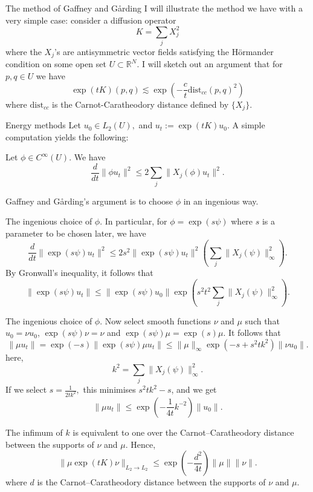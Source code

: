 \documentclass{beamer}
\numberwithin{equation}{section}
\theoremstyle{plain}
\theoremstyle{plain}
\theoremstyle{definition}
\theoremstyle{plain}
\theoremstyle{plain}
\theoremstyle{definition}
\newcommand{\Rl}{\mathbb{R}}
\begin{document}
\begin{frame}{The method of Gaffney and G\aa rding}
  I will illustrate the method we have with a very simple case: consider a diffusion operator
  \[
      K = \sum_{j} X_j^2
  \]
  where the $X_j$'s are antisymmetric vector fields satisfying the H\"ormander condition on some open set $U\subset \Rl^N.$
  \pause
  I will sketch out an argument that for $p,q\in U$ we have
  \[
        \exp(tK)(p,q) \lesssim \exp(-\frac{c}{t}\mathrm{dist}_{cc}(p,q)^2)
  \]
  where $\mathrm{dist}_{cc}$ is the Carnot-Caratheodory distance defined by $\{X_j\}.$
\end{frame}

\begin{frame}{Energy methods}
Let $u_0 \in L_2(U),$ and $u_t := \exp(tK)u_0.$ A simple computation yields the following:
\begin{lemma}
    Let $\phi \in C^\infty(U).$ We have
    \[
        \frac{d}{dt}\|\phi u_t\|^2 \leq 2\sum_j \|X_j(\phi)u_t\|^2.
    \]
\end{lemma}
Gaffney and G\aa rding's argument is to choose $\phi$ in an ingenious way.
\end{frame}

\begin{frame}{The ingenious choice of $\phi.$}
In particular, for $\phi = \exp(s\psi)$ where $s$ is a parameter to be chosen later, we have
\[
    \frac{d}{dt}\|\exp(s\psi)u_t\|^2 \leq 2s^2\|\exp(s\psi)u_t\|^2\left(\sum_{j}\|X_j(\psi)\|_{\infty}^2\right).
\]
By Gronwall's inequality, it follows that
\[
    \|\exp(s\psi)u_t\| \leq \|\exp(s\psi)u_0\|\exp(s^2t^2\sum_j \|X_j(\psi)\|_\infty^2).
\]
\end{frame}

\begin{frame}{The ingenious choice of $\phi.$}
Now select smooth functions $\nu$ and $\mu$ such that $u_0 = \nu u_0$, $\exp(s\psi)\nu = \nu$ and $\exp(s\psi)\mu = \exp(s)\mu.$
It follows that
\[
    \|\mu u_t\| = \exp(-s)\|\exp(s\psi)\mu u_t\| \leq \|\mu\|_\infty\exp(-s+s^2tk^2)\|\nu u_0\|.
\]
here,
\[
    k^2 = \sum_j \|X_j(\psi)\|_\infty^2.
\]
If we select $s = \frac{1}{2tk^2},$ this minimises $s^2tk^2-s$, and we get
\[
    \|\mu u_t\| \leq \exp(-\frac{1}{4t}k^{-2})\|u_0\|.
\]
\end{frame}

\begin{frame}
The infimum of $k$ is equivalent to one over the Carnot--Caratheodory distance between the supports of $\nu$ and $\mu.$ Hence,
\[
    \|\mu\exp(tK)\nu\|_{L_2\to L_2} \leq \exp(-\frac{d^2}{4t})\|\mu\|\|\nu\|.
\]
where $d$ is the Carnot--Caratheodory distance between the supports of $\nu$ and $\mu.$
\end{frame}
\end{document}
